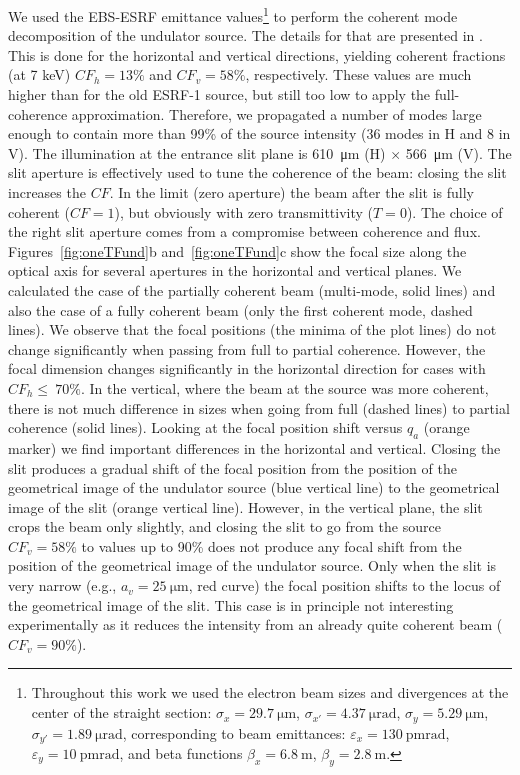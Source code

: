 \documentclass[doublecol]{epl2}
\newcommand{\inred}[1]{{\color{black}#1}} %
\begin{document}
We used the EBS-ESRF emittance values\footnote{Throughout this work we used the electron beam sizes and divergences at the center of the straight section: $\sigma_x=\SI{29.7}{\micro\meter}$,
$\sigma_{x'}=\SI{4.37}{\micro\radian}$,
$\sigma_y=\SI{5.29}{\micro\meter}$,
$\sigma_{y'}=\SI{1.89}{\micro\radian}$, corresponding to beam emittances:  $\varepsilon_x=\SI{130}{\pico\meter \radian}$,
$\varepsilon_y=\SI{10}{\pico\meter \radian}$, and beta functions
$\beta_x=\SI{6.8}{\meter}$,
$\beta_y=\SI{2.8}{\meter}$.
}
to perform the coherent mode decomposition of the undulator source. The details for that are presented in \cite{multioptics}.
This is done for the horizontal and vertical directions, \inred{yielding} coherent fractions (at 7 keV) $CF_h=13\%$ and $CF_v=58\%$, respectively. These values are much higher than for the old ESRF-1 source, but still \inred{too} low to apply \inred{the} full-coherence approximation. Therefore, we propagated a number of modes large enough to contain more than 99\% of the source intensity (36 modes in H and 8 in V). The illumination at the entrance slit plane is \SI{610}{\micro\meter} (H) $\times$ \SI{566}{\micro\meter} (V). The slit aperture is effectively used to tune the coherence of the beam: closing the slit increases the $CF$. In the limit (zero aperture) the beam after the slit is fully coherent ($CF=1$), but obviously with zero transmittivity ($T=0$). The choice of the right slit aperture comes from a compromise between coherence and flux.
Figures~\ref{fig:oneTFund}b and~\ref{fig:oneTFund}c show the focal size along the optical axis for several apertures in the horizontal and vertical planes. We calculated the case of the partially coherent beam (multi-mode, solid lines) and also the case of a fully coherent beam (only the first coherent mode, dashed lines). We observe that the focal positions (the minima of the plot lines) do not change significantly when passing from full to partial coherence. However, the focal dimension changes significantly in the horizontal direction for cases with $CF_h\le~70\%$. In the vertical, where the beam at the source was more coherent, there is \inred{not} much difference in sizes when going from full (dashed lines) to partial coherence (solid lines). Looking \inred{at} the focal position shift versus $q_a$ (orange marker) we find important differences in the horizontal and vertical.
Closing the slit produces a gradual shift of the focal position from the position of the geometrical image of the undulator source (blue vertical line) to the geometrical image of the slit (orange vertical line). However, in the vertical plane, the slit crops the beam only slightly, and closing the slit to go from the source $CF_v=58\%$ to values up to 90\% does not produce any focal shift from the position of the geometrical image of the undulator source. Only when the slit is very \inred{narrow} (e.g., $a_v=\SI{25}{\micro\meter}$, red curve) the focal position shifts to the \inred{locus of the} geometrical image of the slit. This case is in principle not interesting experimentally as it reduces the intensity from an already quite coherent beam ($CF_v=90\%$).
\end{document}
